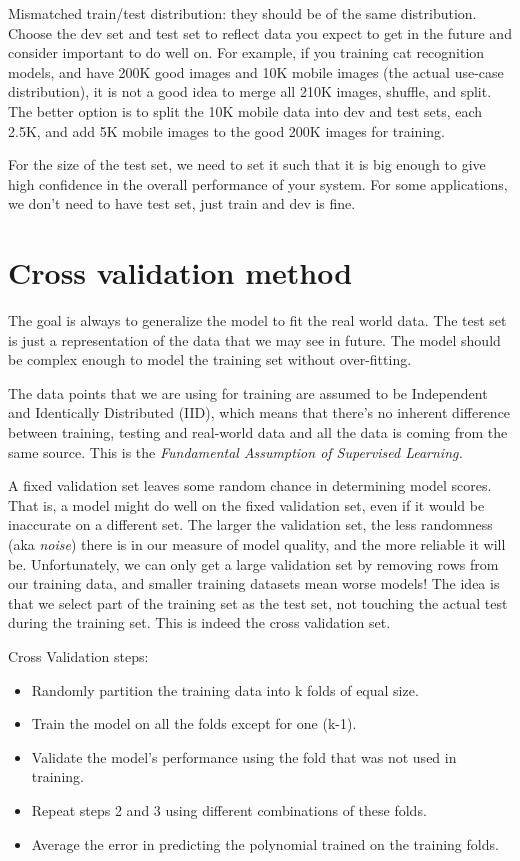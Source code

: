\documentclass[12pt]{report}
\begin{document}
Mismatched train/test distribution: they should be of the same distribution. Choose the dev set and test set to reflect data you expect to get in the future and consider important to do well on. For example, if you training cat recognition models, and have 200K good images and 10K mobile images (the actual use-case distribution), it is not a good idea to merge all 210K images, shuffle, and split. The better option is to split the 10K mobile data into dev and test sets, each 2.5K, and add 5K mobile images to the good 200K images for training.

For the size of the test set, we need to set it such that it is big enough to give high confidence in the overall performance of your system. For some applications, we don't need to have test set, just train and dev is fine.




\section{Cross validation method}

The goal is always to generalize the model to fit the real world data. The test set is just a representation of the data that we may see in future. The model should be complex enough to model the training set without over-fitting.

The data points that we are using for training are assumed to be Independent and Identically Distributed (IID), which means that there’s no inherent difference between training, testing and real-world data and all the data is coming from the same source. This is the \textit{Fundamental Assumption of Supervised Learning.}


A fixed validation set leaves some random chance in determining model scores. That is, a model might do well on the fixed validation set, even if it would be inaccurate on a different set. The larger the validation set, the less randomness (aka \textit{noise}) there is in our measure of model quality, and the more reliable it will be. Unfortunately, we can only get a large validation set by removing rows from our training data, and smaller training datasets mean worse models! The idea is that we select part of the training set as the test set, not touching the actual test during the training set. This is indeed the cross validation set.

Cross Validation steps:

\begin{itemize}
  \item Randomly partition the training data into k folds of equal size.
  \item Train the model on all the folds except for one (k-1).
  \item Validate the model’s performance using the fold that was not used in training.
  \item Repeat steps 2 and 3 using different combinations of these folds.
  \item Average the error in predicting the polynomial trained on the training folds.
\end{itemize}
\end{document}
